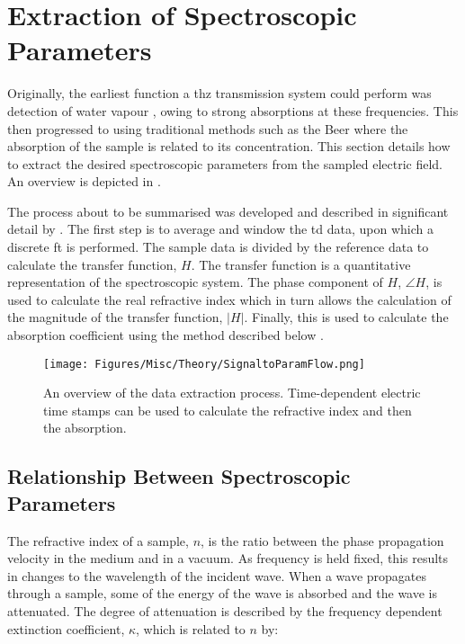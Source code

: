 \section{Extraction of Spectroscopic Parameters}
Originally, the earliest function a \acrshort{thz} transmission system could perform was detection of water vapour \DIFdelbegin \DIFdel{~}\DIFdelend \cite{vanExt1989}, owing to strong absorptions at these frequencies. This then progressed to using traditional methods such as the Beer \DIFdelbegin %
\DIFdelend \DIFaddbegin {}\DIFaddend \cite{Kasap2006} where the absorption of the sample is related to its concentration. This section details how to extract the desired spectroscopic parameters from the sampled electric field. An overview is depicted in . 

The process about to be summarised was developed and described in significant detail by \DIFdelbegin {}\DIFdelend \DIFaddbegin {}\DIFaddend \cite{Greenall2017}. The first step is to average and window the \acrshort{td} data, upon which a discrete \acrfull{ft} is performed. The sample data is divided by the reference data to calculate the transfer function, \(H\). The transfer function is a quantitative representation of the spectroscopic system. The phase component of \(H\), \(\angle H\), is used to calculate the real refractive index which in turn allows the calculation of the magnitude of the transfer function, \(|H|\). Finally, this is used to calculate the absorption coefficient using the method described below \DIFdelbegin \DIFdel{~}\DIFdelend \cite{Greenall2017}.

\begin{figure}[b]
    \centering
    \DIFdelbeginFL %
\DIFdelendFL \DIFaddbeginFL \texttt{[image: Figures/Misc/Theory/SignaltoParamFlow.png]}
    \DIFaddendFL \captionsetup{font = footnotesize, justification = centering}
    \caption[An Overview of the Data Extraction Process]{An overview of the data extraction process. Time-dependent electric time stamps can be used to calculate the refractive index and then the absorption.}
    \label{fig:dataextraction}
\end{figure}

\subsection{Relationship Between Spectroscopic Parameters}
The refractive index of a sample, \(n\), is the ratio between the phase propagation velocity in the medium and in a vacuum. As frequency is held fixed, this results in changes to the wavelength of the incident wave. When a wave propagates through a sample, some of the energy of the wave is absorbed and the wave is attenuated. The degree of attenuation is described by the frequency dependent extinction coefficient, \(\kappa\), which is related to \(n\) by:

